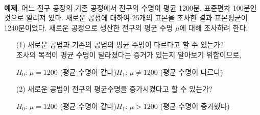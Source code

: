\\
\textbf{예제}. 어느 전구 공장의 기존 공정에서 전구의 수명이 평균 1200분, 표준편차 100분인 것으로 알려져 있다. 새로운 공정에 대하여 25개의 표본을 조사한 결과 표본평균이 1240분이었다. 새로운 공정으로 생산한 전구의 평균 수명 $\mu$에 대해 조사하려 한다.
 \begin{itemize}
	\item[(1)] 새로운 공법과 기존의 공법의 평균 수명이 다르다고 할 수 있는가?\\ 조사의 목적이 평균 수명이 달라졌다는 증거가 있는지 알아보기 위함이므로, \vspace{-3mm}
	\begin{center}
		$H_0$: $\mu=1200$ (평균 수명이 같다)\qquad $H_1$: $\mu \neq 1200$ (평균 수명이 다르다)
	\end{center}\vspace{-3mm}
	\item[(2)] 새로운 공법이 전구의 평균수명을 증가시켰다고 할 수 있는가?\vspace{-3mm}
	\begin{center}
		$H_0$: $\mu=1200$ (평균 수명이 같다)\qquad $H_1$: $\mu > 1200$ (평균 수명이 증가했다)
	\end{center}\vspace{-3mm}	
\end{itemize}~


